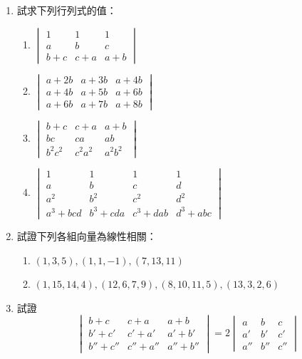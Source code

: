 \begin{enumerate}[label=\arabic*., leftmargin=2em]
  \item 試求下列行列式的值：
  \begin{enumerate}[label=(\roman*)]
    \item $\begin{vmatrix} 1 & 1 & 1 \\ a & b & c \\ b+c & c+a & a+b \end{vmatrix}$
    \item $\begin{vmatrix} a+2b & a+3b & a+4b \\ a+4b & a+5b & a+6b \\ a+6b & a+7b & a+8b \end{vmatrix}$
    \item $\begin{vmatrix} b+c & c+a & a+b \\ bc & ca & ab \\ b^2 c^2 & c^2 a^2 & a^2 b^2 \end{vmatrix}$
    \item $\begin{vmatrix}
    1 & 1 & 1 & 1 \\
    a & b & c & d \\
    a^2 & b^2 & c^2 & d^2 \\
    a^3+bcd & b^3+cda & c^3+dab & d^3+abc
    \end{vmatrix}$
  \end{enumerate}

  \item 試證下列各組向量為線性相關：
  \begin{enumerate}[label=(\roman*)]
    \item $(1, 3, 5), (1, 1, -1), (7, 13, 11)$
    \item $(1, 15, 14, 4), (12, 6, 7, 9), (8, 10, 11, 5), (13, 3, 2, 6)$
  \end{enumerate}

  \item 試證
  \[ \begin{vmatrix}
  b+c & c+a & a+b \\
  b'+c' & c'+a' & a'+b' \\
  b''+c'' & c''+a'' & a''+b''
  \end{vmatrix} = 2 \begin{vmatrix}
  a & b & c \\
  a' & b' & c' \\
  a'' & b'' & c''
  \end{vmatrix} \]


\end{enumerate}
